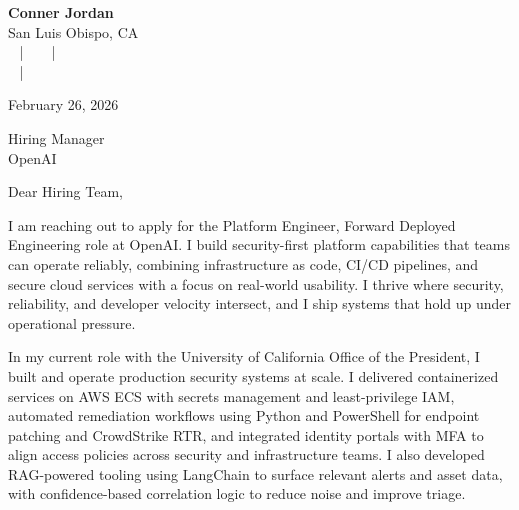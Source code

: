 \documentclass[letterpaper,11pt]{article}
\newcommand{\companyname}{OpenAI}
\begin{document}
\begin{center}
  {\Huge \textbf{Conner Jordan}}\\[4pt]
  {\Large San Luis Obispo, CA}\\[4pt]
  \href{tel:+18059759793}{
    } ~ | ~
  \href{mailto:connercharlesjordan@gmail.com}{
    } ~ | ~
   \\
  \href{https://www.linkedin.com/in/conner-jordan-4b268514a/}{
    } ~ | ~
  \href{https://github.com/cjordan223}{
    }
\end{center}

\vspace{16pt}

\begin{flushright}
February 26, 2026
\end{flushright}

Hiring Manager\\
\companyname

\vspace{26pt}

\noindent
Dear Hiring Team,

\vspace{16pt}

I am reaching out to apply for the Platform Engineer, Forward Deployed Engineering role at OpenAI. I build security-first platform capabilities that teams can operate reliably, combining infrastructure as code, CI/CD pipelines, and secure cloud services with a focus on real-world usability. I thrive where security, reliability, and developer velocity intersect, and I ship systems that hold up under operational pressure.

\vspace{16pt}

In my current role with the University of California Office of the President, I built and operate production security systems at scale. I delivered containerized services on AWS ECS with secrets management and least-privilege IAM, automated remediation workflows using Python and PowerShell for endpoint patching and CrowdStrike RTR, and integrated identity portals with MFA to align access policies across security and infrastructure teams. I also developed RAG-powered tooling using LangChain to surface relevant alerts and asset data, with confidence-based correlation logic to reduce noise and improve triage.
\end{document}
